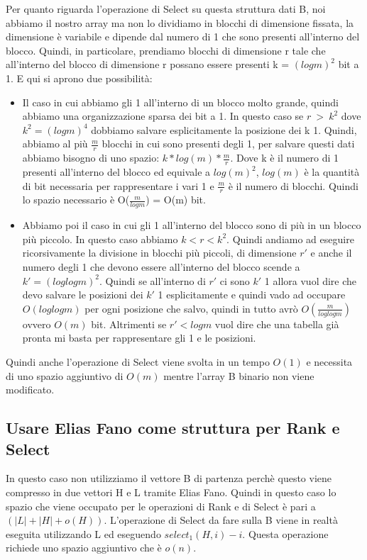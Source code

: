 \documentclass[14pt]{extreport}
\begin{document}
Per quanto riguarda l'operazione di Select su questa struttura dati B, noi abbiamo il nostro array ma non lo dividiamo in blocchi di dimensione fissata, la dimensione è variabile e dipende dal numero di 1 che sono presenti all'interno del blocco.
Quindi, in particolare, prendiamo blocchi di dimensione r tale che all'interno del blocco di dimensione r possano essere presenti k = $(log m)^2$ bit a 1.
E qui si aprono due possibilità:
\begin{itemize}
    \item Il caso in cui abbiamo gli 1 all'interno di un blocco molto grande, quindi abbiamo una organizzazione sparsa dei bit a 1. In questo caso se $r \ > \ k^2$ dove $k^2 = (logm)^4$ dobbiamo salvare esplicitamente la posizione dei k 1.
    Quindi, abbiamo al più $\frac{m}{r}$ blocchi in cui sono presenti degli 1, per salvare questi dati abbiamo bisogno di uno spazio: $k*log(m)*\frac{m}{r}$.
    Dove k è il numero di 1 presenti all'interno del blocco ed equivale a $log(m)^2$, $log(m)$ è la quantità di bit necessaria per rappresentare i vari 1 e $\frac{m}{r}$ è il numero di blocchi. 
    Quindi lo spazio necessario è O($\frac{m}{log m}$) = O(m) bit.
    \item Abbiamo poi il caso in cui gli 1 all'interno del blocco sono di più in un blocco più piccolo. In questo caso abbiamo $k<r<k^2$. 
    Quindi andiamo ad eseguire ricorsivamente la divisione in blocchi più piccoli, di dimensione $r'$ e anche il numero degli 1 che devono essere all'interno del blocco scende a $k' = (log log m)^2$. Quindi se all'interno di $r'$ ci sono $k'$ 1 allora vuol dire che devo salvare le posizioni dei $k'$ 1 esplicitamente e quindi vado ad occupare $O(log log m)$ per ogni posizione che salvo, quindi in tutto avrò $O(\frac{m}{log log m})$ ovvero $O(m)$ bit.
    Altrimenti se $r'<logm$ vuol dire che una tabella già pronta mi basta per rappresentare gli 1 e le posizioni. 
\end{itemize} 

Quindi anche l'operazione di Select viene svolta in un tempo $O(1)$ e necessita di uno spazio aggiuntivo di $O(m)$ mentre l'array B binario non viene modificato.

\subsection{Usare Elias Fano come struttura per Rank e Select}

In questo caso non utilizziamo il vettore B di partenza perchè questo viene compresso in due vettori H e L tramite Elias Fano.
Quindi in questo caso lo spazio che viene occupato per le operazioni di Rank e di Select è pari a $(|L| + |H| + o(H))$.
L'operazione di Select da fare sulla B viene in realtà eseguita utilizzando L ed eseguendo $select_1(H,i) - i$.
Questa operazione richiede uno spazio aggiuntivo che è $o(n)$.
\end{document}
